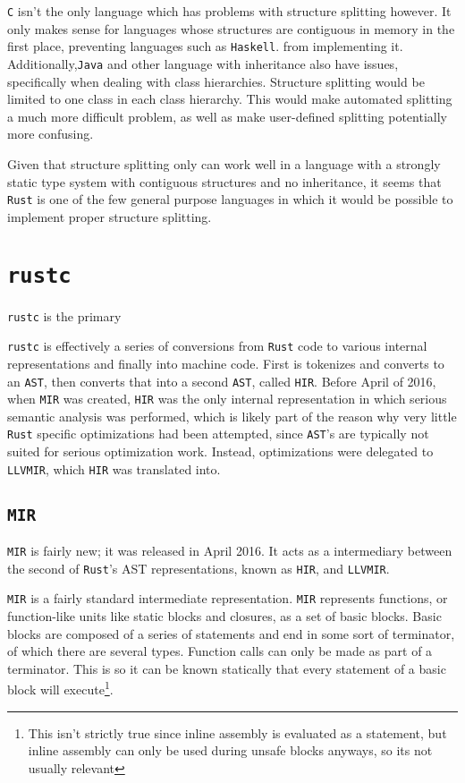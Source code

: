 \documentclass[12pt,oneside]{book}
\newcommand{\rustname}{{\texttt{Rust}}}
\def \rust {\rustname{}\xspace}
\newcommand{\rustcname}{{\texttt{rustc}}}
\def \rustc {\rustcname{}\xspace}
\newcommand{\cname}{{\texttt{C}}}
\def \c {\cname{}\xspace}
\newcommand{\mirname}{{\texttt{MIR}}}
\def \mir {\mirname{}\xspace}
\newcommand{\hirname}{{\texttt{HIR}}}
\def \hir {\hirname{}\xspace}
\newcommand{\llvmirname}{{\texttt{LLVMIR}}}
\def \llvmir {\llvmirname{}\xspace}
\begin{document}
\c isn't the only language which has problems with structure splitting
however. It only makes sense for languages whose structures are contiguous
in memory in the first place, preventing languages such as \texttt{Haskell}.
from implementing it.  Additionally,\texttt{Java} and 
other language with inheritance also
have issues, specifically when dealing with class hierarchies. Structure
splitting would be limited to one class in each class hierarchy. This would
make automated splitting a much more difficult problem, as well as 
make user-defined splitting potentially more confusing.

Given that structure splitting only can work well in a language with
a strongly static type system with contiguous structures and no inheritance,
it seems that \rust is one of the few general purpose languages in which
it would be possible to implement proper structure splitting.

\section{\rustc}
\label{sec:rustc}

\rustc is the primary 

\rustc is effectively a series of conversions from
\rust code to various internal representations and finally into machine code.
First is tokenizes and converts to an \texttt{AST}, then converts that into a
second \texttt{AST}, called \hir. Before April of 2016, when \mir was created,
\hir was the only
internal representation in which serious semantic analysis was performed, which
is likely part of the reason why very little \rust specific optimizations had
been attempted, since \texttt{AST}'s are typically not suited for serious
optimization work. Instead, optimizations were delegated to \llvmir, which \hir
was translated into. 


\subsection{\mir}
\mir is fairly new; it was released in April 2016\cite{mirintro}. It acts as a
intermediary between the second of \rust's AST representations, known as \hir,
and \llvmir.

\mir is a fairly standard intermediate representation. \mir represents functions, 
or function-like units like static blocks and closures, 
as a set of basic blocks. Basic blocks are composed of a series of statements
and end in some sort of terminator, of which there are several types. 
Function calls can only be made as part of a terminator. This is
so it can be known statically that every statement of a basic block will
execute\footnote{This isn't strictly true since inline assembly is evaluated as
  a statement, but inline assembly can only be used during unsafe blocks
  anyways, so its not usually relevant}.
  
\end{document}
